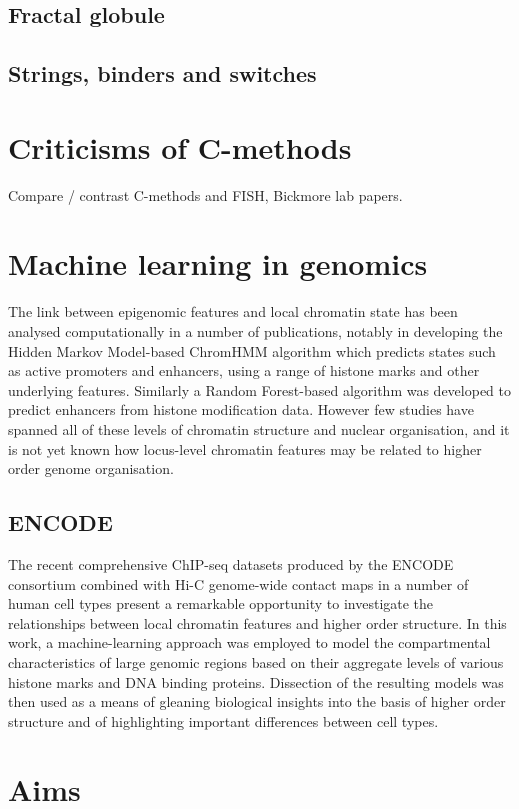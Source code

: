 \documentclass[a4paper,10pt,oneside]{book}
\begin{document}
\subsection{Fractal globule}

\subsection{Strings, binders and switches}

\section{Criticisms of C-methods}

Compare / contrast C-methods and FISH, Bickmore lab papers.

\section{Machine learning in genomics}

The link between epigenomic features and local chromatin state has been
analysed computationally in a number of publications, notably in
developing the
Hidden Markov Model-based ChromHMM\cite{Ernst2012} algorithm which predicts states such as active promoters and enhancers, using a
range of histone marks and other underlying features.\cite{Ernst2011} Similarly a Random Forest-based
algorithm was developed to predict enhancers from histone
modification data.\cite{Rajagopal2013} However few studies have spanned all of
these levels of chromatin structure and nuclear organisation, and it is not yet known how locus-level chromatin features may
be related to higher order genome organisation. \\

\subsection{ENCODE}

The recent comprehensive ChIP-seq datasets
produced by the ENCODE consortium\cite{Dunham2012} combined with Hi-C
genome-wide contact maps in a number of human cell
types\cite{Dixon2012, Lieberman2011, Kalhor2012} present a remarkable
opportunity to investigate the relationships between local
chromatin features and higher order structure. In this work, a
machine-learning approach was employed to model the
compartmental characteristics of large genomic regions based on their
aggregate levels of various histone marks and DNA binding
proteins. Dissection of the resulting models was then used as a
means of gleaning biological insights into the basis of higher order
structure and of highlighting important differences between cell types.

\section{Aims}

\ifstandalone
\begin{small}

\end{small}
\fi
\end{document}

